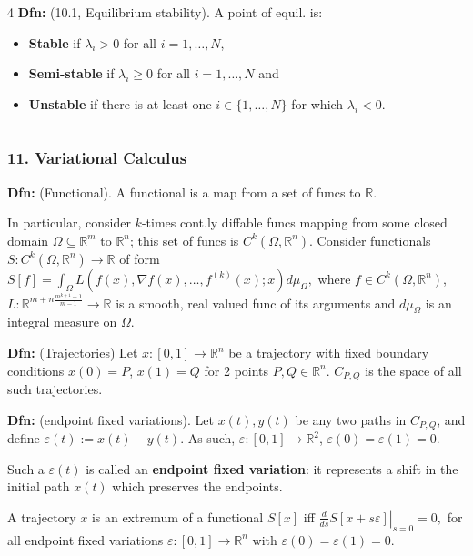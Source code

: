 \documentclass[landscape, 8pt]{extarticle}
\begin{document}
\begin{multicols*}{4}
		\textbf{Dfn:} (10.1, Equilibrium stability). A point of equil. is:
		\begin{itemize}[leftmargin=*,topsep=0pt,itemsep=0pt]
			\item \textbf{Stable} if $\lambda_i>0$ for all $i=1,\ldots,N$,
			\item \textbf{Semi-stable} if $\lambda_i\geq 0$ for all $i=1,\ldots,N$ and
			\item \textbf{Unstable} if there is at least one $i\in\{1,\ldots,N\}$ for which $\lambda_i<0$.
		\end{itemize}
		
		\hrule
		\vspace*{-3pt}
		\subsubsection*{\tiny{11. Variational Calculus}}
		\vspace*{-5pt}
		
		\textbf{Dfn:} (Functional). A functional is a map from a set of funcs to $\mathbb{R}$.
		
		In particular, consider $k$-times cont.ly diffable funcs mapping from some closed domain $\Omega\subseteq\mathbb{R}^m$ to $\mathbb{R}^n$; this set of funcs is $C^k(\Omega,\mathbb{R}^n)$. Consider functionals $S:C^k(\Omega,\mathbb{R}^n)\to\mathbb{R}$ of form
		$
		S[f]=\int_\Omega L(f(x),\nabla f(x),\ldots,f^{(k)}(x);x)d\mu_\Omega,
		$
		where $f\in C^k(\Omega,\mathbb{R}^n)$, $L:\mathbb{R}^{m+n\frac{m^{k+1}-1}{m-1}}\to\mathbb{R}$ is a smooth, real valued func of its arguments and $d\mu_\Omega$ is an integral measure on $\Omega$.
		
		\textbf{Dfn:} (Trajectories) Let $x:[0,1]\to\mathbb{R}^n$ be a trajectory with fixed boundary conditions $x(0)=P$, $x(1)=Q$ for 2 points $P,Q\in\mathbb{R}^n$. $C_{P,Q}$ is the space of all such trajectories.
		
		\textbf{Dfn:} (endpoint fixed variations). Let $x(t),y(t)$ be any two paths in $C_{P,Q}$, and define $\varepsilon(t):=x(t)-y(t)$. As such, $\varepsilon:[0,1]\to\mathbb{R}^2$, $\varepsilon(0)=\varepsilon(1)=0$.
		
		Such a $\varepsilon(t)$ is called an \textbf{endpoint fixed variation}: it represents a shift in the initial path $x(t)$ which preserves the endpoints.
		
		A trajectory $x$ is an extremum of a functional $S[x]$ iff
		$
		\left.\frac{d}{ds}S[x+s\varepsilon]\right|_{s=0}=0,
		$
		for all endpoint fixed variations $\varepsilon:[0,1]\to\mathbb{R}^n$ with $\varepsilon(0)=\varepsilon(1)=0$.
		

\end{multicols*}
\end{document}
